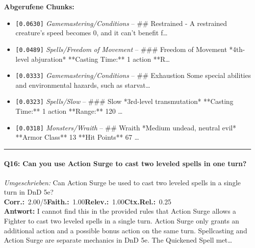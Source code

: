 \noindent\textbf{Abgerufene Chunks:}
\begin{itemize}[noitemsep, topsep=2pt]
  \item[\textbf{\#1}] \texttt{[0.0630]} \textit{Gamemastering/Conditions} -- \#\# Restrained  - A restrained creature's speed becomes 0, and it can't benefit f\ldots
  \item[\textbf{\#2}] \texttt{[0.0489]} \textit{Spells/Freedom of Movement} -- \#\#\# Freedom of Movement  *4th-level abjuration*  **Casting Time:** 1 action  **R\ldots
  \item[\textbf{\#3}] \texttt{[0.0333]} \textit{Gamemastering/Conditions} -- \#\# Exhaustion  Some special abilities and environmental hazards, such as starvat\ldots
  \item[\textbf{\#4}] \texttt{[0.0323]} \textit{Spells/Slow} -- \#\#\# Slow  *3rd-level transmutation*  **Casting Time:** 1 action  **Range:** 120 \ldots
  \item[\textbf{\#5}] \texttt{[0.0318]} \textit{Monsters/Wraith} -- \#\# Wraith  *Medium undead, neutral evil*  **Armor Class** 13  **Hit Points** 67 \ldots
\end{itemize}
\vspace{4pt}
\hrule
\vspace{6pt}

\paragraph{Q16: Can you use Action Surge to cast two leveled spells in one turn?}
\textit{Umgeschrieben:} Can Action Surge be used to cast two leveled spells in a single turn in DnD 5e?\\[2pt]
\noindent \textbf{Corr.:}~2.00/5\quad \textbf{Faith.:}~1.00\quad \textbf{Relev.:}~1.00\quad \textbf{Ctx.Rel.:}~0.25\\

\noindent\textbf{Antwort:} I cannot find this in the provided rules that Action Surge allows a Fighter to cast two leveled spells in a single turn. Action Surge only grants an additional action and a possible bonus action on the same turn. Spellcasting and Action Surge are separate mechanics in DnD 5e. The Quickened Spell met\ldots

